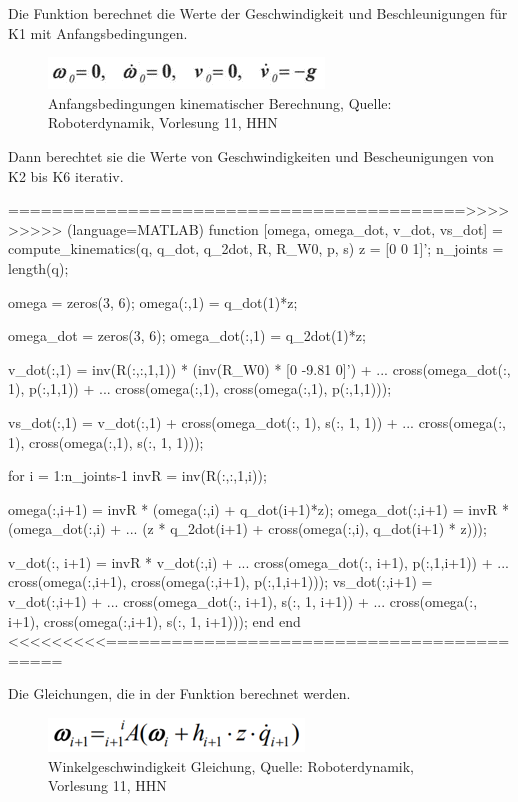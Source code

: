 Die Funktion berechnet die Werte der Geschwindigkeit und Beschleunigungen für K1 mit Anfangsbedingungen. 

	\begin{figure}[!htbp]
		\centering
		\includegraphics[width=1\linewidth]{grafic/anfangsbedingungen}
		\caption{Anfangsbedingungen kinematischer Berechnung, Quelle: Roboterdynamik, Vorlesung 11, HHN}
		\label{fig:anfangsbedingungen}
	\end{figure}


Dann berechtet sie die Werte von Geschwindigkeiten und Bescheunigungen von K2 bis K6 iterativ.

	==========================================>>>>>>>>> (language=MATLAB)
	function [omega, omega_dot, v_dot, vs_dot] = compute_kinematics(q, q_dot, q_2dot, R, R_W0, p, s)
		z = [0 0 1]';
		n_joints = length(q);

		omega = zeros(3, 6);
		omega(:,1) = q_dot(1)*z;
		
		omega_dot = zeros(3, 6);
		omega_dot(:,1) = q_2dot(1)*z;
		
		
		v_dot(:,1) = inv(R(:,:,1,1)) * (inv(R_W0) * [0 -9.81 0]') + ...
			cross(omega_dot(:, 1), p(:,1,1)) + ...
			cross(omega(:,1), cross(omega(:,1), p(:,1,1))); 

		vs_dot(:,1) = v_dot(:,1) + cross(omega_dot(:, 1), s(:, 1, 1)) + ...
			cross(omega(:, 1), cross(omega(:,1), s(:, 1, 1))); 
		
		for i = 1:n_joints-1
			invR = inv(R(:,:,1,i));

			omega(:,i+1) = invR * (omega(:,i) + q_dot(i+1)*z);
			omega_dot(:,i+1) = invR * (omega_dot(:,i) + ...
				(z * q_2dot(i+1) + cross(omega(:,i), q_dot(i+1) * z)));

			v_dot(:, i+1) = invR * v_dot(:,i) + ...
				cross(omega_dot(:, i+1), p(:,1,i+1)) + ...
				cross(omega(:,i+1), cross(omega(:,i+1), p(:,1,i+1)));
			vs_dot(:,i+1) = v_dot(:,i+1) + ...
				cross(omega_dot(:, i+1), s(:, 1, i+1)) + ...
				cross(omega(:, i+1), cross(omega(:,i+1), s(:, 1, i+1)));
		end
	end
	<<<<<<<<<==========================================


	Die Gleichungen, die in der Funktion berechnet werden.

	\begin{figure}[!htbp]
		\centering
		\includegraphics[width=1\linewidth]{grafic/omega_gleichung}
		\caption{Winkelgeschwindigkeit Gleichung, Quelle: Roboterdynamik, Vorlesung 11, HHN}
		\label{fig:omega_gleichung}
	\end{figure}


